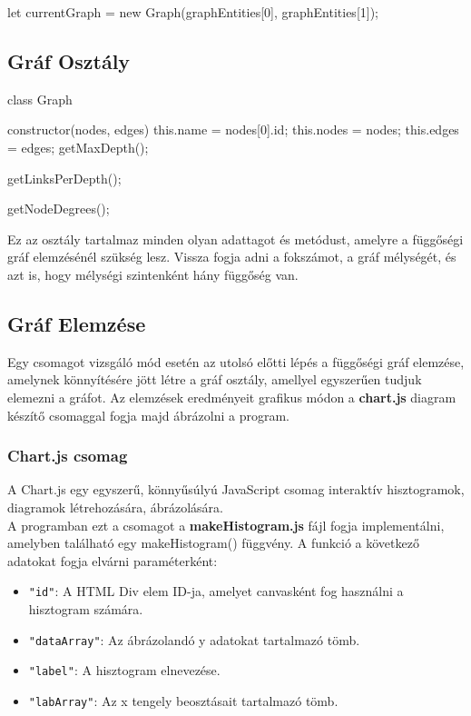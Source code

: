 \begin{js}
let currentGraph = new Graph(graphEntities[0], graphEntities[1]);
\end{js}

\pagebreak

\subsection{Gráf Osztály}

\begin{js}
class Graph{
	constructor(nodes, edges){
		this.name = nodes[0].id;
		this.nodes = nodes;
		this.edges = edges;
	}
	getMaxDepth();
	
	getLinksPerDepth();
	
	getNodeDegrees();
}
\end{js}

Ez az osztály tartalmaz minden olyan adattagot és metódust, amelyre a függőségi gráf elemzésénél szükség lesz. Vissza fogja adni a fokszámot, a gráf mélységét, és azt is, hogy mélységi szintenként hány függőség van.

\subsection{Gráf Elemzése}

Egy csomagot vizsgáló mód esetén az utolsó előtti lépés a függőségi gráf elemzése, amelynek könnyítésére jött létre a gráf osztály, amellyel egyszerűen tudjuk elemezni a gráfot. Az elemzések eredményeit grafikus módon a \textbf{chart.js} diagram készítő csomaggal fogja majd ábrázolni a program.

\subsubsection{Chart.js csomag}

A Chart.js egy egyszerű, könnyűsúlyú JavaScript csomag interaktív hisztogramok, diagramok létrehozására, ábrázolására.\\

A programban ezt a csomagot a \textbf{makeHistogram.js} fájl fogja implementálni, amelyben található egy makeHistogram() függvény. A funkció a következő adatokat fogja elvárni paraméterként: 

\begin{itemize}
	\item \texttt{"id"}: A HTML Div elem ID-ja, amelyet canvasként fog használni a hisztogram számára.
	\item \texttt{"dataArray"}: Az ábrázolandó y adatokat tartalmazó tömb.
	\item \texttt{"label"}: A hisztogram elnevezése.
	\item \texttt{"labArray"}: Az x tengely beosztásait tartalmazó tömb.
\end{itemize} 

